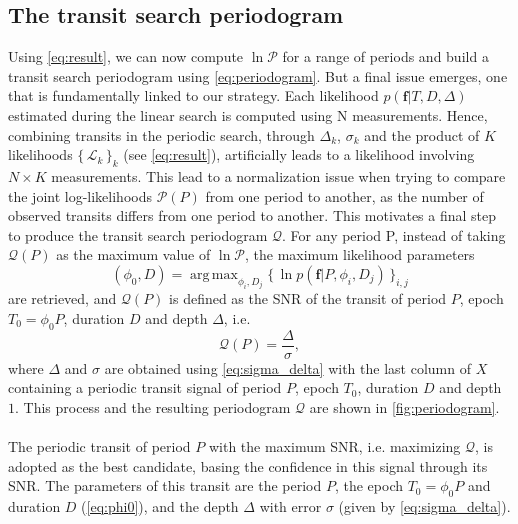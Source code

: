 \documentclass{aastex631}
\newcommand{\set}[1]{\{\,#1\,\}}
\DeclareMathOperator*{\argmax}{arg\,max}
\begin{document}
\subsection{The transit search periodogram}

Using \autoref{eq:result}, we can now compute $\ln\mathcal{P}$ for a range of periods and build a transit search periodogram using \autoref{eq:periodogram}. But a final issue emerges, one that is fundamentally linked to our strategy. Each likelihood $p(\bm{f} \vert T, D, \Delta)$ estimated during the linear search is computed using N measurements. Hence, combining transits in the periodic search, through $\Delta_k$, $\sigma_k$ and the product of $K$ likelihoods $\set{\mathcal{L}_k}_k$ (see \autoref{eq:result}), artificially leads to a likelihood involving $N\times K$ measurements. This lead to a normalization issue when trying to compare the joint log-likelihoods $\mathcal{P}(P)$ from one period to another, as the number of observed transits differs from one period to another. This motivates a final step to produce the transit search periodogram $\mathcal{Q}$. For any period P, instead of taking $ \mathcal{Q}(P)$ as the maximum value of $\ln\mathcal{P}$, the maximum likelihood parameters
\begin{equation}\label{eq:phi0}
    (\phi_0 ,D) = \argmax_{\phi_i, D_j} \set{\ln p(\bm{f} \vert P, \phi_i, D_j)}_{i, j}
\end{equation}
are retrieved, and $\mathcal{Q}(P)$ is defined as the SNR of the transit of period $P$, epoch $T_0 = \phi_0 P$, duration $D$ and depth $\Delta$, i.e.
\begin{equation*}
    \mathcal{Q}(P) = \frac{\Delta}{\sigma},
\end{equation*}
where $\Delta$ and $\sigma$ are obtained using \autoref{eq:sigma_delta} with the last column of $X$ containing a periodic transit signal of period $P$, epoch $T_0$, duration $D$ and depth $1$. This process and the resulting periodogram $\mathcal{Q}$ are shown in \autoref{fig:periodogram}.\\\\
The periodic transit of period $P$ with the maximum SNR, i.e. maximizing $\mathcal{Q}$, is adopted as the best candidate, basing the confidence in this signal through its SNR. The parameters of this transit are the period $P$, the epoch $T_0 = \phi_0 P$ and duration $D$ (\autoref{eq:phi0}), and the depth $\Delta$ with error $\sigma$ (given by \autoref{eq:sigma_delta}).
\end{document}
